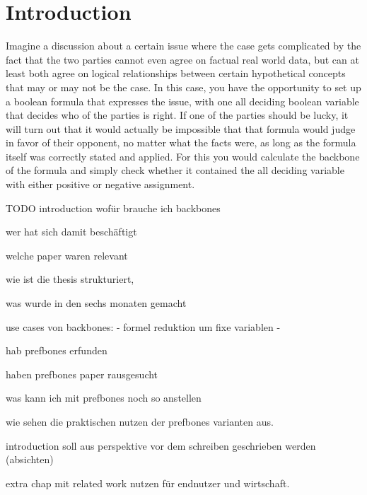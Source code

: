\chapter{Introduction}
Imagine a discussion about a certain issue where the case gets complicated by the fact that the two parties cannot even agree on factual real world data, but can at least both agree on logical relationships between certain hypothetical concepts that may or may not be the case. In this case, you have the opportunity to set up a boolean formula that expresses the issue, with one all deciding boolean variable that decides who of the parties is right. If one of the parties should be lucky, it will turn out that it would actually be impossible that that formula would judge in favor of their opponent, no matter what the facts were, as long as the formula itself was correctly stated and applied. For this you would calculate the backbone of the formula and simply check whether it contained the all deciding variable with either positive or negative assignment. 


TODO introduction
wofür brauche ich backbones

wer hat sich damit beschäftigt

welche paper waren relevant

wie ist die thesis strukturiert, 

was wurde in den sechs monaten gemacht


use cases von backbones:
- formel reduktion um fixe variablen
- 



hab prefbones erfunden

haben prefbones paper rausgesucht

was kann ich mit prefbones noch so anstellen

wie sehen die praktischen nutzen der prefbones varianten aus.



introduction soll aus perspektive vor dem schreiben geschrieben werden (absichten)

extra chap mit related work
nutzen für endnutzer und wirtschaft.